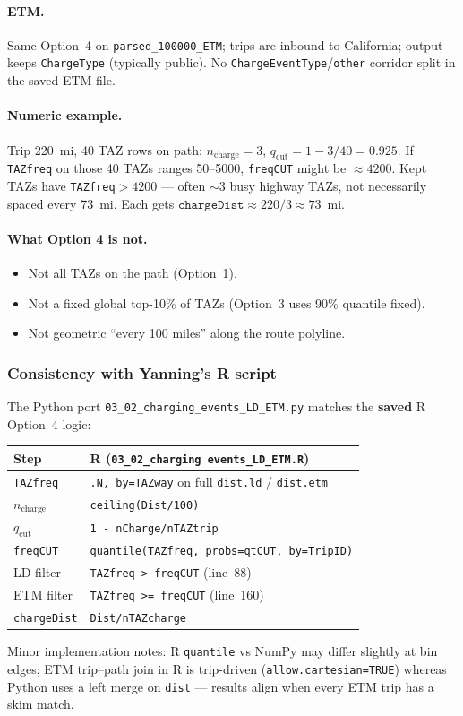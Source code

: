 \documentclass[11pt,a4paper]{article}
\begin{document}
\paragraph{ETM.} Same Option~4 on \texttt{parsed\_100000\_ETM}; trips are inbound to California; output keeps \texttt{ChargeType} (typically public). No \texttt{ChargeEventType}/\texttt{other} corridor split in the saved ETM file.

\paragraph{Numeric example.}
Trip 220~mi, 40 TAZ rows on path: $n_{\text{charge}}=3$, $q_{\text{cut}}=1-3/40=0.925$. If \texttt{TAZfreq} on those 40 TAZs ranges 50--5000, \texttt{freqCUT} might be $\approx 4200$. Kept TAZs have \texttt{TAZfreq}$>4200$ --- often $\sim$3 busy highway TAZs, not necessarily spaced every 73~mi. Each gets $\texttt{chargeDist}\approx 220/3 \approx 73$~mi.

\paragraph{What Option 4 is not.}
\begin{itemize}[noitemsep]
  \item Not all TAZs on the path (Option~1).
  \item Not a fixed global top-10\% of TAZs (Option~3 uses 90\% quantile fixed).
  \item Not geometric ``every 100 miles'' along the route polyline.
\end{itemize}

\subsubsection{Consistency with Yanning's R script}
The Python port \texttt{03\_02\_charging\_events\_LD\_ETM.py} matches the \textbf{saved} R Option~4 logic:
\begin{center}
\small
\begin{tabular}{ll}
\toprule
Step & R (\texttt{03\_02\_charging events\_LD\_ETM.R}) \\
\midrule
\texttt{TAZfreq} & \texttt{.N, by=TAZway} on full \texttt{dist.ld} / \texttt{dist.etm} \\
$n_{\text{charge}}$ & \texttt{ceiling(Dist/100)} \\
$q_{\text{cut}}$ & \texttt{1 - nCharge/nTAZtrip} \\
\texttt{freqCUT} & \texttt{quantile(TAZfreq, probs=qtCUT, by=TripID)} \\
LD filter & \texttt{TAZfreq > freqCUT} (line~88) \\
ETM filter & \texttt{TAZfreq >= freqCUT} (line~160) \\
\texttt{chargeDist} & \texttt{Dist/nTAZcharge} \\
\bottomrule
\end{tabular}
\end{center}
Minor implementation notes: R \texttt{quantile} vs NumPy may differ slightly at bin edges; ETM trip--path join in R is trip-driven (\texttt{allow.cartesian=TRUE}) whereas Python uses a left merge on \texttt{dist} --- results align when every ETM trip has a skim match.
\end{document}
